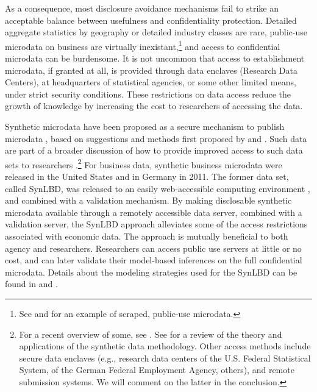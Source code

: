 \documentclass[10pt,twoside]{article}
\begin{document}
As a consequence, most disclosure avoidance mechanisms  fail to strike an acceptable balance between usefulness and confidentiality protection. Detailed aggregate statistics by geography or detailed industry classes  are rare, public-use microdata on business are virtually inexistant,\footnote{See \citet{NBERw22095} and \citet{startupcartography} for an example of scraped, public-use microdata.} and access to confidential microdata can be burdensome. It is not uncommon that access to establishment microdata, if granted at all, is provided through data enclaves (Research Data Centers), at headquarters of statistical agencies, or some other limited means, under strict security conditions. These restrictions on data access reduce the growth of knowledge by increasing the cost to researchers of accessing the data.

Synthetic microdata have been proposed as a secure mechanism to publish microdata \citep{drechsler2008,RePEc:taf:japsta:v:39:y:2012:i:2:p:243-265,NAP11844,SJIAOS-2014c}, based on suggestions and methods first proposed by \citet{rubin93} and \citet{little93}. Such data are  part of a broader discussion of how  to provide improved access to such data sets to researchers  \citep{Bender2009,Vilhuber2013,AbowdLane2004,AbowdSchmutte_BPEA2015}.\footnote{For a recent overview of some, see \citet{VilhuberAbowdReiter:Synthetic:SJIAOS:2016}. See \citet{dre:2011} for a review of the theory and applications of the synthetic data methodology.
	Other access methods include secure data enclaves (e.g., research data centers of the U.S. Federal Statistical System, of the  German Federal Employment Agency, others), and  remote submission systems. We will comment on the latter in the conclusion.}
For business data, synthetic business microdata were released in the United States \citep{KinneyEtAl2011} and in Germany  \citep{RePEc:iab:iabfme:201101_de} in 2011. The former data set, called \ac{SynLBD}, was  released to an easily web-accessible computing environment \citep{AbowdVilhuber2010}, and combined with a validation mechanism.  By making disclosable synthetic microdata available through a remotely accessible data server, combined with a validation server, the SynLBD approach alleviates some of the access restrictions associated with economic data. The approach is mutually beneficial to both agency and researchers. Researchers can access public use servers at little or no cost, and can later validate their model-based inferences on the full confidential microdata. Details about the modeling strategies used for the SynLBD   can be found in  \citet{KinneyEtAl2011} 
and \citet{RePEc:cen:tnotes:11-01}.
\end{document}
